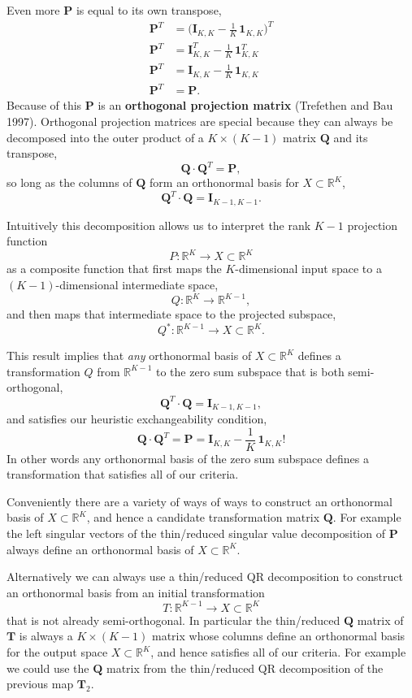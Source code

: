 \documentclass[
  letterpaper,
  DIV=11,
  numbers=noendperiod]{scrartcl}
\begin{document}
Even more \(\mathbf{P}\) is equal to its own transpose, \begin{align*}
\mathbf{P}^{T}
&=
\bigg( \mathbf{I}_{K, K} - \frac{1}{K} \, \mathbf{1}_{K, K} \bigg)^{T}
\\
\mathbf{P}^{T}
&=
\mathbf{I}_{K, K}^{T} - \frac{1}{K} \, \mathbf{1}_{K, K}^{T}
\\
\mathbf{P}^{T}
&=
\mathbf{I}_{K, K} - \frac{1}{K} \, \mathbf{1}_{K, K}
\\
\mathbf{P}^{T}
&=
\mathbf{P}.
\end{align*} Because of this \(\mathbf{P}\) is an \textbf{orthogonal
projection matrix} (Trefethen and Bau 1997). Orthogonal projection
matrices are special because they can always be decomposed into the
outer product of a \(K \times (K - 1)\) matrix \(\mathbf{Q}\) and its
transpose, \[
\mathbf{Q} \cdot \mathbf{Q}^{T} = \mathbf{P},
\] so long as the columns of \(\mathbf{Q}\) form an orthonormal basis
for \(X \subset \mathbb{R}^{K}\), \[
\mathbf{Q}^{T} \cdot \mathbf{Q} = \mathbf{I}_{K - 1, K - 1}.
\]

Intuitively this decomposition allows us to interpret the rank \(K - 1\)
projection function \[
P : \mathbb{R}^{K} \rightarrow X \subset \mathbb{R}^{K}
\] as a composite function that first maps the \(K\)-dimensional input
space to a \((K - 1)\)-dimensional intermediate space, \[
Q : \mathbb{R}^{K} \rightarrow \mathbb{R}^{K - 1},
\] and then maps that intermediate space to the projected subspace, \[
Q^{*} : \mathbb{R}^{K - 1} \rightarrow X \subset \mathbb{R}^{K}.
\]

This result implies that \emph{any} orthonormal basis of
\(X \subset \mathbb{R}^{K}\) defines a transformation \(Q\) from
\(\mathbb{R}^{K - 1}\) to the zero sum subspace that is both
semi-orthogonal, \[
\mathbf{Q}^{T} \cdot \mathbf{Q} = \mathbf{I}_{K - 1, K - 1},
\] and satisfies our heuristic exchangeability condition, \[
\mathbf{Q} \cdot \mathbf{Q}^{T}
=
\mathbf{P}
=
\mathbf{I}_{K, K} - \frac{1}{K} \, \mathbf{1}_{K, K}!
\] In other words any orthonormal basis of the zero sum subspace defines
a transformation that satisfies all of our criteria.

Conveniently there are a variety of ways of ways to construct an
orthonormal basis of \(X \subset \mathbb{R}^{K}\), and hence a candidate
transformation matrix \(\mathbf{Q}\). For example the left singular
vectors of the thin/reduced singular value decomposition of
\(\mathbf{P}\) always define an orthonormal basis of
\(X \subset \mathbb{R}^{K}\).

Alternatively we can always use a thin/reduced QR decomposition to
construct an orthonormal basis from an initial transformation \[
T : \mathbb{R}^{K - 1} \rightarrow X \subset \mathbb{R}^{K}
\] that is not already semi-orthogonal. In particular the thin/reduced
\(\mathbf{Q}\) matrix of \(\mathbf{T}\) is always a \(K \times (K - 1)\)
matrix whose columns define an orthonormal basis for the output space
\(X \subset \mathbb{R}^{K}\), and hence satisfies all of our criteria.
For example we could use the \(\mathbf{Q}\) matrix from the thin/reduced
QR decomposition of the previous map \(\mathbf{T}_{2}\).
\end{document}
